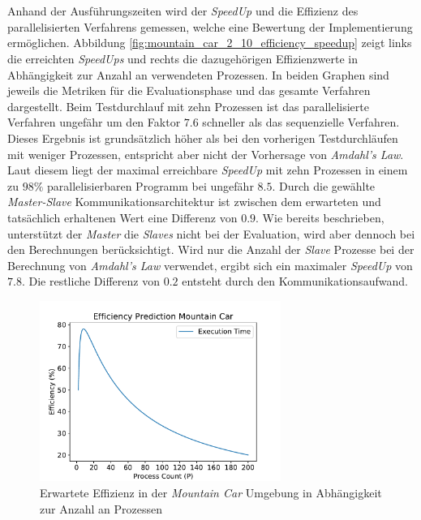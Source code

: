 \\\\
Anhand der Ausführungszeiten wird der \emph{SpeedUp} und die Effizienz des parallelisierten Verfahrens gemessen, welche eine Bewertung der Implementierung ermöglichen. Abbildung \ref{fig:mountain_car_2_10_efficiency_speedup} zeigt links die erreichten \emph{SpeedUps} und rechts die dazugehörigen Effizienzwerte in Abhängigkeit zur Anzahl an verwendeten Prozessen. In beiden Graphen sind jeweils die Metriken für die Evaluationsphase und das gesamte Verfahren dargestellt. Beim Testdurchlauf mit zehn Prozessen ist das parallelisierte Verfahren ungefähr um den Faktor $7.6$ schneller als das sequenzielle Verfahren. Dieses Ergebnis ist grundsätzlich höher als bei den vorherigen Testdurchläufen mit weniger Prozessen, entspricht aber nicht der Vorhersage von \emph{Amdahl's Law}. Laut diesem liegt der maximal erreichbare \emph{SpeedUp} mit zehn Prozessen in einem zu $98\%$ parallelisierbaren Programm bei ungefähr $8.5$. Durch die gewählte \emph{Master-Slave} Kommunikationsarchitektur ist zwischen dem erwarteten und tatsächlich erhaltenen Wert eine Differenz von $0.9$. Wie bereits beschrieben, unterstützt der \emph{Master} die \emph{Slaves} nicht bei der Evaluation, wird aber dennoch bei den Berechnungen berücksichtigt. Wird nur die Anzahl der \emph{Slave} Prozesse bei der Berechnung von \emph{Amdahl's Law} verwendet, ergibt sich ein maximaler \emph{SpeedUp} von $7.8$. Die restliche Differenz von $0.2$ entsteht durch den Kommunikationsaufwand. 
\begin{figure}[!h]
	\centering
	\includegraphics[width=0.7\textwidth]{./img/mountain_car_analysis/mountain_car_efficiency_prediction.pdf} 
	\caption{Erwartete Effizienz in der \emph{Mountain Car} Umgebung in Abhängigkeit zur Anzahl an Prozessen}
	\label{fig:mountain_car_efficiency_predidction}
\end{figure}
